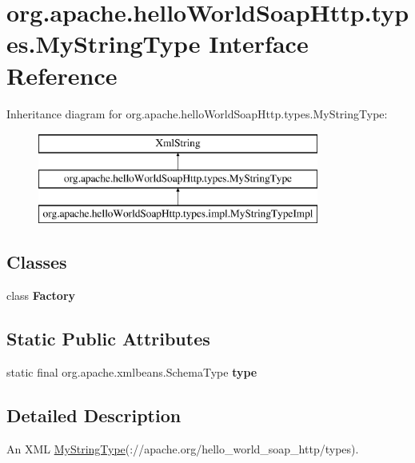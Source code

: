 \hypertarget{interfaceorg_1_1apache_1_1hello_world_soap_http_1_1types_1_1_my_string_type}{}\section{org.\+apache.\+hello\+World\+Soap\+Http.\+types.\+My\+String\+Type Interface Reference}
\label{interfaceorg_1_1apache_1_1hello_world_soap_http_1_1types_1_1_my_string_type}
Inheritance diagram for org.\+apache.\+hello\+World\+Soap\+Http.\+types.\+My\+String\+Type\+:\begin{figure}[H]
\begin{center}
\leavevmode
\includegraphics[height=3.000000cm]{interfaceorg_1_1apache_1_1hello_world_soap_http_1_1types_1_1_my_string_type}
\end{center}
\end{figure}
\subsection*{Classes}
\begin{DoxyCompactItemize}
\item 
class {\bfseries Factory}
\end{DoxyCompactItemize}
\subsection*{Static Public Attributes}
\begin{DoxyCompactItemize}
\item 
static final org.\+apache.\+xmlbeans.\+Schema\+Type {\bfseries type}
\end{DoxyCompactItemize}


\subsection{Detailed Description}
An X\+M\+L \hyperlink{interfaceorg_1_1apache_1_1hello_world_soap_http_1_1types_1_1_my_string_type}{My\+String\+Type}(\+://apache.org/hello\+\_\+world\+\_\+soap\+\_\+http/types).


